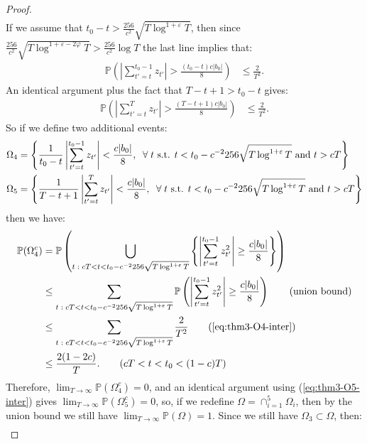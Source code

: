 \begin{proof}
\begin{align*}
\end{align*}
If we assume that $t_0-t > \frac{256}{c^2}\sqrt{T\log^{1+\varepsilon}T}$, then since $\frac{256}{c^2}\sqrt{T\log^{1+\varepsilon-2\varphi}T} > \frac{256}{c^2}\log T$ the last line implies that:
\begin{align}
    \mathbb{P}\left(\left|\sum_{t'=t}^{t_0-1} z_{t'}\right| > \frac{(t_0-t) c|b_0|}{8}\right) &\leq \frac{2}{T^2}. \label{eq:thm3-O4-inter}
\end{align}
An identical argument plus the fact that $T - t + 1 > t_0 - t$ gives:
\begin{align}
    \mathbb{P}\left(\left|\sum_{t'=t}^T z_{t'}\right| > \frac{(T-t + 1) c|b_0|}{8}\right) &\leq \frac{2}{T^2}. \label{eq:thm3-O5-inter}
\end{align}
So if we define two additional events:
\begin{align*}
    \Omega_4 &= \left\{\frac{1}{t_0-t}\left|\sum_{t'=t}^{t_0-1} z_{t'}\right| < \frac{c|b_0|}{8}, \; \;\forall\; t \text{ s.t. } t < t_0 - c^{-2}256\sqrt{T\log^{1+\varepsilon}T} \text{ and } t > cT\right\}\\
    \Omega_5 &= \left\{\frac{1}{T-t+1}\left|\sum_{t'=t}^T z_{t'}\right| < \frac{c|b_0|}{8}, \; \;\forall\; t \text{ s.t. } t < t_0 - c^{-2}256\sqrt{T\log^{1+\varepsilon}T} \text{ and } t > cT\right\}
\end{align*}
then we have:
\begin{align*}
    \mathbb{P}(\Omega^c_4) &= \mathbb{P}\left(\bigcup_{t\;:\; cT < t < t_0 - c^{-2}256\sqrt{T\log^{1+\varepsilon}T}} \left\{\left|\sum_{t'=t}^{t_0-1} z^2_{t'}\right| \geq \frac{c|b_0|}{8}\right\}\right) \\
    &\leq \sum_{t\;:\; cT < t < t_0 - c^{-2}256\sqrt{T\log^{1+\varepsilon}T}} \mathbb{P}\left(\left|\sum_{t'=t}^{t_0-1} z^2_{t'}\right| \geq \frac{c|b_0|}{8}\right) \tag{union bound}\\
    &\leq \sum_{t\;:\; cT < t < t_0 - c^{-2}256\sqrt{T\log^{1+\varepsilon}T}} \frac{2}{T^2} \tag{\ref{eq:thm3-O4-inter}} \\
    &\leq \frac{2(1-2c)}{T}. \tag{$cT < t < t_0 < (1-c)T$}
\end{align*}
Therefore, $\lim_{T\to \infty} \mathbb{P}(\Omega^c_4) = 0$, and an identical argument using (\ref{eq:thm3-O5-inter}) gives $\lim_{T\to \infty} \mathbb{P}(\Omega^c_5) = 0$, so, if we redefine $\Omega = \cap_{i=1}^5 \Omega_i$, then by the union bound we still have $\lim_{T \to \infty} \mathbb{P}(\Omega) = 1$. Since we still have $\Omega_3 \subset \Omega$, then: 
\begin{align*}

\end{align*}
\end{proof}

